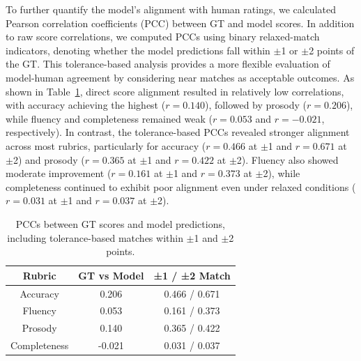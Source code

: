 \documentclass{Interspeech}
\begin{document}
To further quantify the model’s alignment with human ratings, we calculated Pearson correlation coefficients (PCC) between GT and model scores. In addition to raw score correlations, we computed PCCs using binary relaxed-match indicators, denoting whether the model predictions fall within $\pm$1 or $\pm$2 points of the GT. This tolerance-based analysis provides a more flexible evaluation of model-human agreement by considering near matches as acceptable outcomes. As shown in Table~\ref{tab:combined_pcc}, direct score alignment resulted in relatively low correlations, with accuracy achieving the highest ($r = 0.140$), followed by prosody ($r = 0.206$), while fluency and completeness remained weak ($r = 0.053$ and $r = -0.021$, respectively). In contrast, the tolerance-based PCCs revealed stronger alignment across most rubrics, particularly for accuracy ($r = 0.466$ at $\pm$1 and $r = 0.671$ at $\pm$2) and prosody ($r = 0.365$ at $\pm$1 and $r = 0.422$ at $\pm$2). Fluency also showed moderate improvement ($r = 0.161$ at $\pm$1 and $r = 0.373$ at $\pm$2), while completeness continued to exhibit poor alignment even under relaxed conditions ($r = 0.031$ at $\pm$1 and $r = 0.037$ at $\pm$2).



\begin{table}[ht!]
\centering
\small
\caption{PCCs between GT scores and model predictions, including tolerance-based matches within $\pm$1 and $\pm$2 points.}
\label{tab:combined_pcc}
\begin{tabular}{ccc}
\toprule
\textbf{Rubric} & \textbf{GT vs Model} & \textbf{±1 / ±2 Match} \\
\midrule
Accuracy     & 0.206 & 0.466 / 0.671 \\
Fluency      & 0.053 & 0.161 / 0.373 \\
Prosody      & 0.140 & 0.365 / 0.422 \\
Completeness & -0.021 & 0.031 / 0.037 \\
\bottomrule
\end{tabular}
\end{table}

\end{document}
